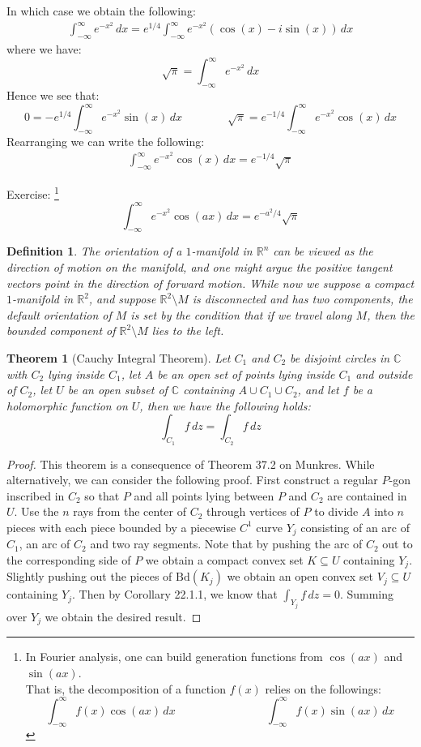 \documentclass[15pt]{book}
\theoremstyle{break}
\theoremstyle{break}
\newtheorem{thm}{Theorem}[section]
\newtheorem{defn}{Definition}[corL]
\newcommand{\R}{\mathbb{R}}
\newcommand{\Bd}{\text{Bd}}
\newcommand{\Complex}{\mathbb{C}}
\newcommand{\exercise}{\color{green}Exercise: \color{black}}
\begin{document}
In which case we obtain the following:
\begin{align*}
\int_{-\infty}^{\infty} e^{-x^2} \, dx = e^{1/4} \int_{-\infty}^\infty e^{-x^2} (\cos(x) - i \sin(x)) \, dx
\end{align*}
where we have: 
$$\sqrt{\pi} = \int_{-\infty}^{\infty} e^{-x^2} \, dx$$
Hence we see that:
$$0 = -e^{1/4} \int_{-\infty}^{\infty} e^{-x^2} \sin(x) \, dx\qquad\qquad \sqrt{\pi} = e^{-1/4} \int_{-\infty}^\infty e^{-x^2} \cos(x) \, dx$$
Rearranging we can write the following:
\begin{align*}
\int_{-\infty}^{\infty} e^{-x^2} \cos(x) \, dx = e^{-1/4} \sqrt{\pi}
\end{align*}

\hfill\break
\hfill\break
\exercise\footnote{In Fourier analysis, one can build generation functions from $\cos(ax)$ and $\sin(ax)$. \\ ${}$\qquad That is, the decomposition of a function $f(x)$ relies on the followings:
$$\int_{-\infty}^\infty f(x) \cos(ax)\, dx \qquad\qquad\qquad\qquad \int_{-\infty}^\infty f(x) \sin(ax)\, dx$$} $$\int_{-\infty}^{\infty} e^{-x^2} \cos(ax)\,dx = e^{-a^2/4} \sqrt{\pi}$$


\hfill\break

\begin{defn}
The orientation of a $1$-manifold in $\R^n$ can be viewed as the direction of motion on the manifold, and one might argue the positive tangent vectors point in the direction of forward motion. While now we suppose a compact $1$-manifold in $\R^2$, and suppose $\R^2 \setminus M$ is disconnected and has two components, the default orientation of $M$ is set by the condition that if we travel along $M$, then the bounded component of $\R^2 \setminus M$ lies to the left.
\end{defn}

\begin{thm}[Cauchy Integral Theorem]
Let $C_1$ and $C_2$ be disjoint circles in $\Complex$ with $C_2$ lying inside $C_1$, let $A$ be an open set of points lying inside $C_1$ and outside of $C_2$, let $U$ be an open subset of $\Complex$ containing $A\cup C_1 \cup C_2$, and let $f$ be a holomorphic function on $U$, then we have the following holds: $$\int_{C_1} f \, dz = \int_{C_2} f\, dz$$ 
\end{thm}
\begin{proof}
This theorem is a consequence of Theorem 37.2 on Munkres. While alternatively, we can consider the following proof. First construct a regular $P$-gon inscribed in $C_2$ so that $P$ and all points lying between $P$ and $C_2$ are contained in $U$. Use the $n$ rays from the center of $C_2$ through vertices of $P$ to divide $A$ into $n$ pieces with each piece bounded by a piecewise $C^1$ curve $Y_j$ consisting of an arc of $C_1$, an arc of $C_2$ and two ray segments. Note that by
pushing the arc of $C_2$ out to the corresponding side of $P$ we obtain a compact convex set $K\subseteq U$ containing $Y_j$. Slightly pushing out the pieces of $\Bd(K_j)$ we obtain an open convex set $V_j \subseteq U$ containing $Y_j$. Then by Corollary 22.1.1, we know that $\int_{Y_j} f\, dz = 0$. Summing over $Y_j$ we obtain the desired result. 
\end{proof}
\end{document}
